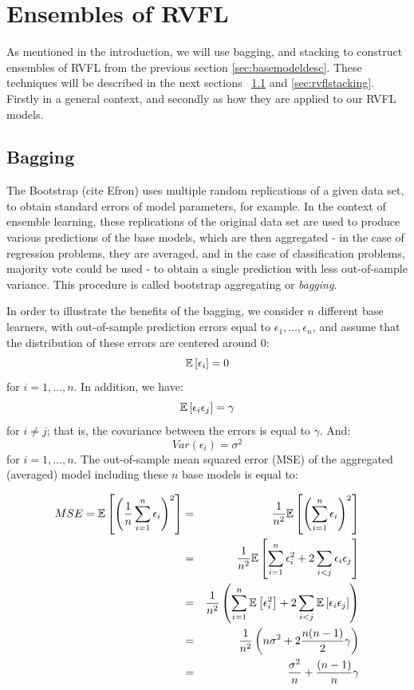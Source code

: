 \section{Ensembles of RVFL}
\label{sec:ensemblemethods}

As mentioned in the introduction, we will use bagging, and stacking to construct ensembles of RVFL from the previous section \ref{sec:basemodeldesc}. These   techniques will be described in the next sections ~\ref{sec:rvflbagging} and \ref{sec:rvflstacking}. Firstly in a general context, and secondly as how they are applied to our RVFL models.


\subsection{Bagging}
\label{sec:rvflbagging}

The Bootstrap (cite Efron) uses multiple random replications of a given data set, to obtain standard errors of model parameters, for example. In the context of ensemble learning, these replications of the original data set are used to produce various predictions of the base models, which are then aggregated - in the case of regression problems, they are averaged, and in the case of classification problems, majority vote could be used - to obtain a single prediction with less out-of-sample variance. This procedure is called bootstrap aggregating or \textit{bagging}.

\medskip

In order to illustrate the benefits of the bagging, we consider $n$ different base learners, with out-of-sample prediction errors equal to $\epsilon_1, \ldots, \epsilon_n$, and assume that the distribution of these errors are centered around $0$:
$$
\mathbb{E} \left[ \epsilon_i\right] = 0
$$
for $i = 1, \ldots, n$. In addition, we have:
$$
\mathbb{E} \left[ \epsilon_i \epsilon_j\right] = \gamma
$$
for $i \neq j$; that is, the covariance between the errors is equal to $\gamma$. And:
$$
Var(\epsilon_i) = \sigma^2
$$
for $i = 1, \ldots, n$. The out-of-sample mean squared error (MSE) of the aggregated (averaged) model including these $n$ base models is equal to:

\begin{eqnarray*}
MSE = \mathbb{E}\left[ \left( \frac{1}{n} \sum_{i = 1}^n \epsilon_i \right)^2 \right] &=& \frac{1}{n^2} \mathbb{E}\left[ \left( \sum_{i = 1}^n \epsilon_i \right)^2 \right]\\
 &=& \frac{1}{n^2} \mathbb{E}\left[ \sum_{i = 1}^n \epsilon_i^2 + 2 \sum_{i < j} \epsilon_i \epsilon_j  \right]\\
 &=& \frac{1}{n^2} \left( \sum_{i = 1}^n \mathbb{E}\left[\epsilon_i^2\right] + 2 \sum_{i < j} \mathbb{E}\left[\epsilon_i \epsilon_j  \right] \right)\\
 &=& \frac{1}{n^2} \left( n \sigma^2 + 2 \frac{n(n-1)}{2} \gamma \right)\\
 &=& \frac{\sigma^2}{n} + \frac{(n-1)}{n} \gamma \\
\end{eqnarray*}

